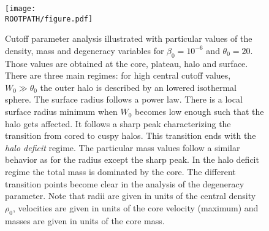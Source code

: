 \begin{figure}%
	\centering%
	\texttt{[image: \\ROOTPATH/figure.pdf]}
	\caption{Cutoff parameter analysis illustrated with particular values of the density, mass and degeneracy variables for $\beta_0 = 10^{-6}$ and $\theta_0 = 20$. Those values are obtained at the core, plateau, halo and surface. There are three main regimes: for high central cutoff values, $W_0 \gg \theta_0$ the outer halo is described by an lowered isothermal sphere. The surface radius follows a power law. There is a local surface radius minimum when $W_0$ becomes low enough such that the halo gets affected. It follows a sharp peak characterizing the transition from cored to cuspy halos. This transition ends with the \textit{halo deficit} regime. The particular mass values follow a similar behavior as for the radius except the sharp peak. In the halo deficit regime the total mass is dominated by the core. The different transition points become clear in the analysis of the degeneracy parameter. Note that radii are given in units of the central density $\rho_0$, velocities are given in units of the core velocity (maximum) and masses are given in units of the core mass.}%
	\label{fig:analysis:with-cutoff:W0:core}%
\end{figure}